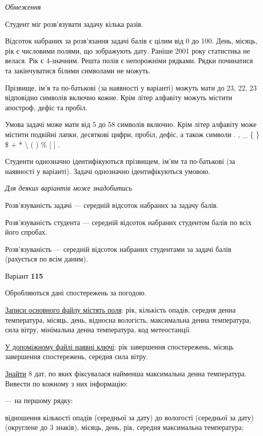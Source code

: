 \documentclass[11pt, ukrainian]{article}
\begin{document}

\bigskip\textit{Обмеження}

Студент міг розв’язувати задачу кілька разів.

Відсоток набраних за розв’язання задачі балів є цілим від 0 до 100.
День, місяць, рік є числовими полями, що зображують дату.
Раніше 2001 року статистика не велася. Рік є 4-значним.
Решта полів є непорожніми рядками.
Рядки починатися та закінчуватися білими символами не можуть.

Прізвище, ім’я та по-батькові (за наявності у варіанті) можуть мати до 23, 22, 23 відповідно символів включно кожне. 
Крім літер алфавіту можуть містити апостроф, дефіс та пробіл.

Умова задачі може мати від 5 до 58 символів включно.
Крім літер алфавіту може містити подвійні лапки, десяткові цифри, пробіл, дефіс,
а також символи . , \_ \{ \} \$ $+$ $*$ {\textbackslash} ( ) \% $[$ $]$ .

Студенти однозначно ідентифікуються прізвищем, ім’ям та по-батькові (за наявності у варіанті).
Задачі однозначно ідентифікуються умовою.

\bigskip\textit{Для деяких варіантів може знадобитись}

Розв'язуваність задачі --- середній відсоток набраних за задачу балів.

Розв'язуваність студента --- середній відсоток набраних студентом балів по всіх його спробах.

Розв'язуваність --- середній відсоток набраних студентами за задачі балів (рахується по всім даним).




\par
\newpage
{\center Варіант  \No \textbf { 115 }\par}
\bigskip
Обробляються дані спостережень за погодою. 

\underline{Записи основного файлу містять поля}: рік, кількість опадів, середня денна температура, місяць, день, відносна вологість, максимальна денна температура, сила вітру, мінімальна денна температура, код метеостанції.

\underline{У допоміжному файлі наявні ключі}: рік завершення спостережень, місяць завершення спостережень, середня сила вітру.

\underline{Знайти} 8 дат, по яких фіксувалася найменша максимальна  денна температура. Вивести по кожному з них інформацію:\par
{\noindent}--- на першому рядку:\par
відношення кількості опадів (середньої за дату) до вологості (середньої за дату) (округлене до 3 знаків), місяць, день, рік, середня максимальна температура;
\end{document}
